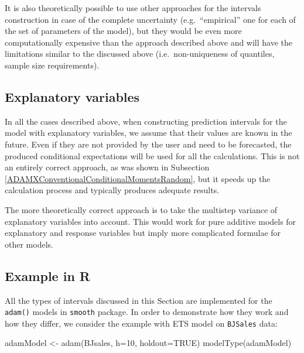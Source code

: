 \documentclass[
]{book}
\newenvironment{Shaded}{\begin{snugshade}}{\end{snugshade}}
\newcommand{\AttributeTok}[1]{\textcolor[rgb]{0.77,0.63,0.00}{#1}}
\newcommand{\ConstantTok}[1]{\textcolor[rgb]{0.00,0.00,0.00}{#1}}
\newcommand{\DecValTok}[1]{\textcolor[rgb]{0.00,0.00,0.81}{#1}}
\newcommand{\FunctionTok}[1]{\textcolor[rgb]{0.00,0.00,0.00}{#1}}
\newcommand{\NormalTok}[1]{#1}
\newcommand{\OtherTok}[1]{\textcolor[rgb]{0.56,0.35,0.01}{#1}}
\theoremstyle{definition}
\theoremstyle{definition}
\theoremstyle{definition}
\theoremstyle{definition}
\theoremstyle{remark}
\begin{document}
It is also theoretically possible to use other approaches for the intervals construction in case of the complete uncertainty (e.g.~``empirical'' one for each of the set of parameters of the model), but they would be even more computationally expensive than the approach described above and will have the limitations similar to the discussed above (i.e.~non-uniqueness of quantiles, sample size requirements).

\hypertarget{explanatory-variables-1}{%
\subsection{Explanatory variables}\label{explanatory-variables-1}}

In all the cases described above, when constructing prediction intervals for the model with explanatory variables, we assume that their values are known in the future. Even if they are not provided by the user and need to be forecasted, the produced conditional expectations will be used for all the calculations. This is not an entirely correct approach, as was shown in Subsection \ref{ADAMXConventionalConditionalMomentsRandom}, but it speeds up the calculation process and typically produces adequate results.

The more theoretically correct approach is to take the multistep variance of explanatory variables into account. This would work for pure additive models for explanatory and response variables but imply more complicated formulae for other models.

\hypertarget{ADAMForecastingPIExample}{%
\subsection{Example in R}\label{ADAMForecastingPIExample}}

All the types of intervals discussed in this Section are implemented for the \texttt{adam()} models in \texttt{smooth} package. In order to demonstrate how they work and how they differ, we consider the example with ETS model on \texttt{BJSales} data:

\begin{Shaded}
\begin{Highlighting}[]
\NormalTok{adamModel }\OtherTok{\textless{}{-}} \FunctionTok{adam}\NormalTok{(BJsales, }\AttributeTok{h=}\DecValTok{10}\NormalTok{, }\AttributeTok{holdout=}\ConstantTok{TRUE}\NormalTok{)}
\FunctionTok{modelType}\NormalTok{(adamModel)}
\end{Highlighting}
\end{Shaded}
\end{document}
